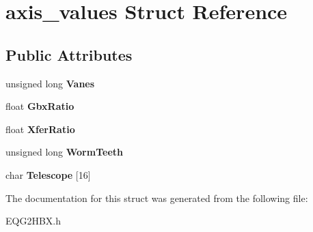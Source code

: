 \hypertarget{structaxis__values}{}\section{axis\+\_\+values Struct Reference}
\label{structaxis__values}
\subsection*{Public Attributes}
\begin{DoxyCompactItemize}
\item 
\mbox{\label{structaxis__values_a69fe070e634631a905091b64b69ed733}} 
unsigned long {\bfseries Vanes}
\item 
\mbox{\label{structaxis__values_a8fba82b610a5c029a7b492f3f84c4c4b}} 
float {\bfseries Gbx\+Ratio}
\item 
\mbox{\label{structaxis__values_a59119ea853e5881b2718e0c1d45a81a4}} 
float {\bfseries Xfer\+Ratio}
\item 
\mbox{\label{structaxis__values_a847c89951bc827b17958f586adf6c2b4}} 
unsigned long {\bfseries Worm\+Teeth}
\item 
\mbox{\label{structaxis__values_a0b78a78c0d2ad6333b60955c57d70b75}} 
char {\bfseries Telescope} \mbox{[}16\mbox{]}
\end{DoxyCompactItemize}


The documentation for this struct was generated from the following file\+:\begin{DoxyCompactItemize}
\item 
E\+Q\+G2\+H\+B\+X.\+h\end{DoxyCompactItemize}
